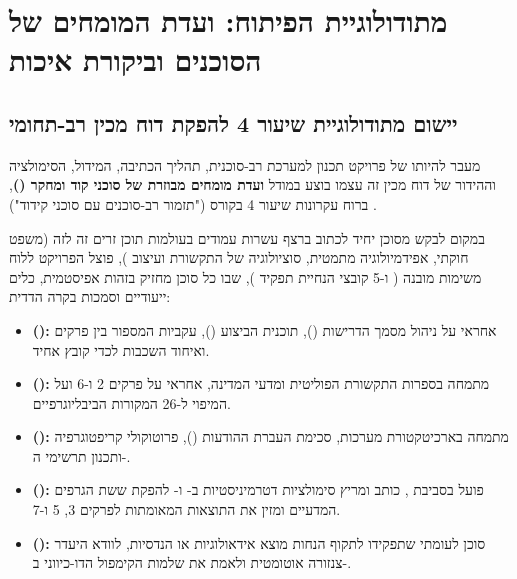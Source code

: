 \chapter{מתודולוגיית הפיתוח: ועדת המומחים של הסוכנים וביקורת איכות}
\label{ch:methodology}

\section{יישום מתודולוגיית שיעור 4 להפקת דוח מכין רב-תחומי}
מעבר להיותו של פרויקט  תכנון למערכת רב-סוכנית, תהליך הכתיבה, המידול, הסימולציה וההידור של דוח מכין זה עצמו בוצע במודל \textbf{ועדת מומחים מבוזרת של סוכני קוד ומחקר ()}, ברוח עקרונות שיעור 4 בקורס ("תזמור רב-סוכנים עם סוכני קידוד") \cite{segal2026l04}.

במקום לבקש מסוכן יחיד לכתוב ברצף עשרות עמודים בעולמות תוכן זרים זה לזה (משפט חוקתי, אפידמיולוגיה מתמטית, סוציולוגיה של התקשורת ועיצוב ), פוצל הפרויקט ללוח משימות מובנה ( ו-5 קובצי הנחיית תפקיד ), שבו כל סוכן מחזיק בזהות אפיסטמית, כלים ייעודיים וסמכות בקרה הדדית:
\begin{itemize}
    \item \textbf{ ():} אחראי על ניהול מסמך הדרישות (), תוכנית הביצוע (), עקביות המספור בין פרקים ואיחוד השכבות לכדי קובץ  אחיד.
    \item \textbf{ ():} מתמחה בספרות התקשורת הפוליטית ומדעי המדינה, אחראי על פרקים 2 ו-6 ועל המיפוי ל-26 המקורות הביבליוגרפיים.
    \item \textbf{ ():} מתמחה בארכיטקטורת מערכות, סכימת העברת ההודעות (), פרוטוקולי קריפטוגרפיה ותכנון תרשימי ה-.
    \item \textbf{ ():} פועל בסביבת , כותב ומריץ סימולציות דטרמיניסטיות ב- ו- להפקת ששת הגרפים המדעיים ומזין את התוצאות המאומתות לפרקים 3, 5 ו-7.
    \item \textbf{ ():} סוכן לעומתי שתפקידו לתקוף הנחות מוצא אידאולוגיות או הנדסיות, לוודא היעדר צנזורה אוטומטית ולאמת את שלמות הקימפול הדו-כיווני ב-.
\end{itemize}

